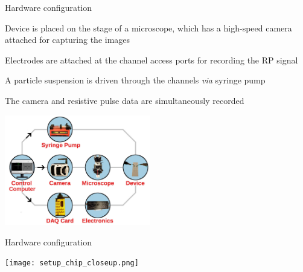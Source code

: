 \begin{frame}[c]{Hardware configuration}


	{\footnotesize
		Device is placed on the stage of a microscope, which has a high-speed camera attached for capturing the images
		
		Electrodes are attached at the channel access ports for recording the RP signal
		
		A particle suspension is driven through the channels \textit{via} syringe pump
		
		The camera and resistive pulse data are simultaneously recorded
	}
	
	{\centering 
		\includegraphics[width=2.5in]{hardware.jpg} \\
		\par
	}
	

\end{frame}





\begin{frame}[c]{Hardware configuration}


	{\centering 
		\texttt{[image: setup\_chip\_closeup.png]} \\
		\par
	}
	
	

\end{frame}





